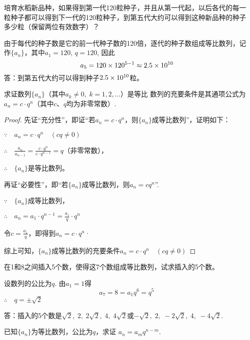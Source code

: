 \begin{example}
    培育水稻新品种，如果得到第一代120粒种子，并且从第一代起，以后各代的每一粒种子都可以得到下一代的120粒种子，到第五代大约可以得到这种新品种的种子多少粒（保留两位有效数字）？
\end{example}

\begin{solution}
由于每代的种子数是它的前一代种子数的120倍，逐代的种子数组成等比数列，记作$\{a_n\}$，其中$a_1=120$, $q=120$, 因此
\[a_5=120\times120^{5-1}\approx 2.5\times10^{10}\]
答：到第五代大约可以得到种子$2.5\times10^{10}$粒。
\end{solution}

    
\begin{example}
    求证数列$\{a_n\}$（其中$a_k\ne 0,\; k=1,2,\ldots$）是等比
数列的充要条件是其通项公式为$a_n=c\cdot q^n$（其中$c$、$q$均为非零常数）.
\end{example}

\begin{proof}
先证“充分性”，即证“若$a_n=c\cdot q^n$，则$\{a_n\}$成等比数列”，证明如下：

$\because\quad a_n=c\cdot q^n\quad (cq\ne 0)$

$\therefore\quad \frac{a_n}{a_{n-1}}=\frac{c\cdot q^n}{c\cdot q^{n-1}}=q$（非零常数），

$\therefore\quad \{a_n\}$是等比数列。

再证“必要性”，即“若$\{a_n\}$成等比数列，则$a_n=cq^n$”.

$\because\quad\{a_n\}$成等比数列，

$\therefore\quad a_n=a_1\cdot q^{n-1}=\frac{a_1}{q}\cdot q^n$

令$c=\frac{a_1}{q}$，即得到$a_n=c\cdot q^n$·

综上可知，$\{a_n\}$成等比数列的充要条件$a_n=c\cdot q^n\quad (cq\ne 0)$
\end{proof}

\begin{example}
    在1和8之间插入5个数，使得这7个数组成等比数列，试求插入的5个数。
\end{example}

\begin{solution}
    设数列的公比为$q$. 由$a_1=1$得
\[a_7=8=a_1 q^6=q^5\]
$\therefore\quad q=\pm\sqrt{2}$

答：插入的5个数是$\sqrt{2},\; 2,\; 2\sqrt{2},\; 4,\; 4\sqrt{2}$或$-\sqrt{2},\; 2,\; -2\sqrt{2},\; 4,\; -4\sqrt{2}$.
\end{solution}

\begin{example}
    已知$\{a_n\}$为等比数列，公比为$q$，求证
$a_n=a_mq^{n-m}$.
\end{example}

